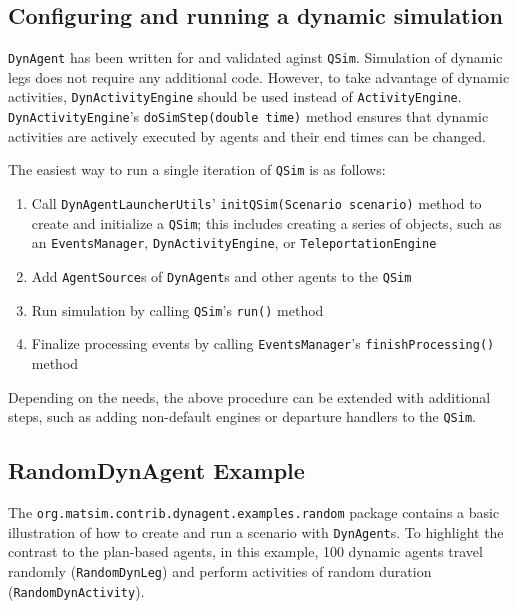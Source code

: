 \subsection{Configuring and running a dynamic simulation}
\label{sec:config-dyn-sim}

\lstinline$DynAgent$ has been written for and validated aginst \lstinline$QSim$. Simulation of dynamic legs does not require any additional code. However, to take advantage of dynamic activities,  \lstinline$DynActivityEngine$ should be used instead of \lstinline$ActivityEngine$. \lstinline$DynActivityEngine$'s \lstinline$doSimStep(double time)$ method ensures that dynamic activities are actively executed by agents and their end times can be changed.

The easiest way to run a single iteration of \lstinline$QSim$ is as follows:
%
\begin{enumerate}

	\item Call \lstinline$DynAgentLauncherUtils$' \lstinline$initQSim(Scenario scenario)$ method to create and initialize a \lstinline$QSim$; this includes creating a series of objects, such as an \lstinline$EventsManager$, \lstinline$DynActivityEngine$, or \lstinline$TeleportationEngine$

	\item Add \lstinline$AgentSource$s of \lstinline$DynAgent$s and other agents to the \lstinline$QSim$
	
	\item Run simulation by calling \lstinline$QSim$'s \lstinline$run()$ method
	
	\item Finalize processing events by calling \lstinline$EventsManager$'s \lstinline$finishProcessing()$ method
	
\end{enumerate}
%
Depending on the needs, the above procedure can be extended with additional steps, such as adding non-default engines or departure handlers to the \lstinline$QSim$.

\subsection{RandomDynAgent Example}

The \lstinline$org.matsim.contrib.dynagent.examples.random$ package contains a basic illustration of how to create and run a scenario with \lstinline$DynAgent$s. To highlight the contrast to the plan-based agents, in this example, 100 dynamic agents travel randomly (\lstinline$RandomDynLeg$) and perform activities of random duration (\lstinline$RandomDynActivity$).

